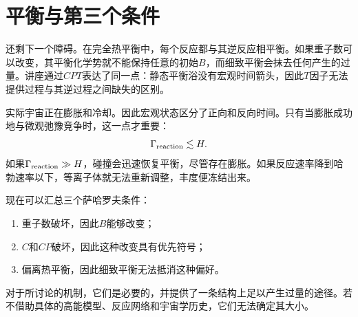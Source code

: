 \section{平衡与第三个条件}

还剩下一个障碍。在完全热平衡中，每个反应都与其逆反应相平衡。如果重子数可以改变，其平衡化学势就不能保持任意的初始\(B\)，而细致平衡会抹去任何产生的过量。讲座通过\(CPT\)表达了同一点：静态平衡浴没有宏观时间箭头，因此\(T\)因子无法提供过程与其逆过程之间缺失的区别。

实际宇宙正在膨胀和冷却。因此宏观状态区分了正向和反向时间。只有当膨胀成功地与微观弛豫竞争时，这一点才重要：
\begin{equation}
\Gamma_{\rm reaction}\lesssim H.
\label{eq:c08-freezeout-condition}
\end{equation}
如果\(\Gamma_{\rm reaction}\gg H\)，碰撞会迅速恢复平衡，尽管存在膨胀。如果反应速率降到哈勃速率以下，等离子体就无法重新调整，丰度便冻结出来。

\begin{classroomqa}
\end{classroomqa}

现在可以汇总三个萨哈罗夫条件：
\begin{enumerate}
\item 重子数破坏，因此\(B\)能够改变；
\item \(C\)和\(CP\)破坏，因此这种改变具有优先符号；
\item 偏离热平衡，因此细致平衡无法抵消这种偏好。
\end{enumerate}
对于所讨论的机制，它们是必要的，并提供了一条结构上足以产生过量的途径。若不借助具体的高能模型、反应网络和宇宙学历史，它们无法确定其大小。

\begin{classroomqa}
\end{classroomqa}

\begin{classroomqa}
\end{classroomqa}

